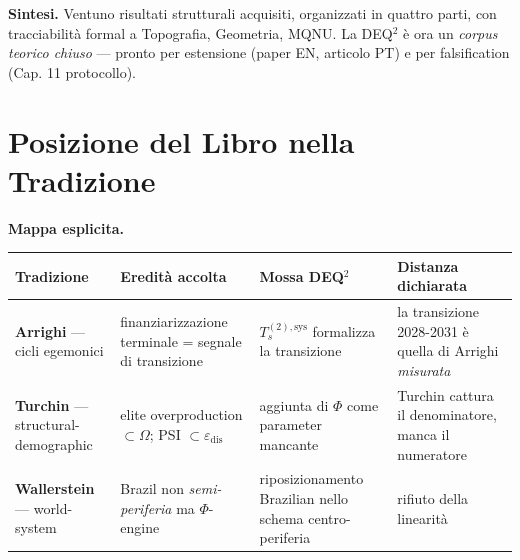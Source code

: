 \Hypoth{} \textbf{Sintesi.} Ventuno risultati strutturali acquisiti,
organizzati in quattro parti, con tracciabilità formal a Topografia,
Geometria, MQNU. La DEQ$^2$ è ora un \emph{corpus teorico chiuso} ---
pronto per estensione (paper EN, articolo PT) e per falsification (Cap.
11 protocollo).



\section{Posizione del Libro nella
Tradizione}\label{posizione-del-libro-nella-tradizione}

\Hypoth{} \textbf{Mappa esplicita.}

{\def\LTcaptype{none} %
{\small\begin{longtable}[]{@{}
  >{\raggedright\arraybackslash}p{}
  >{\raggedright\arraybackslash}p{}
  >{\raggedright\arraybackslash}p{}
  >{\raggedright\arraybackslash}p{}@{}}
\toprule\noalign{}
\begin{minipage}[b]{\linewidth}\raggedright
Tradizione
\end{minipage} & \begin{minipage}[b]{\linewidth}\raggedright
Eredità accolta
\end{minipage} & \begin{minipage}[b]{\linewidth}\raggedright
Mossa DEQ$^2$
\end{minipage} & \begin{minipage}[b]{\linewidth}\raggedright
Distanza dichiarata
\end{minipage} \\
\midrule\noalign{}
\endhead
\bottomrule\noalign{}
\endlastfoot
\textbf{Arrighi} --- cicli egemonici & finanziarizzazione terminale =
segnale di transizione & \(T_s^{(2),\text{sys}}\) formalizza la
transizione & la transizione 2028-2031 è quella di Arrighi
\emph{misurata} \\
\textbf{Turchin} --- structural-demographic & elite overproduction
\(\subset \Omega\); PSI \(\subset \varepsilon_{\text{dis}}\) & aggiunta
di \(\Phi\) come parameter mancante & Turchin cattura il denominatore,
manca il numeratore \\
\textbf{Wallerstein} --- world-system & Brazil non
\emph{semi-periferia} ma \(\Phi\)-engine & riposizionamento Brazilian
nello schema centro-periferia & rifiuto della linearità

\end{longtable}}}
